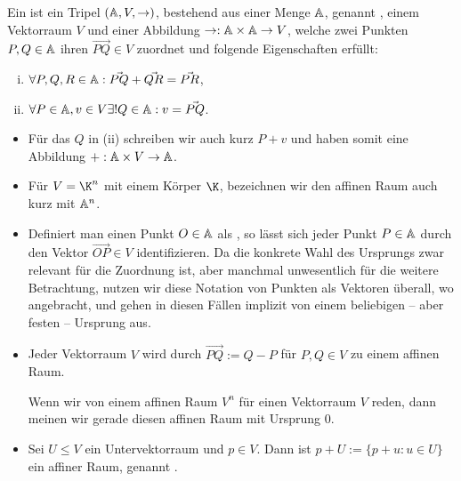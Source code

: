 \begin{df}
	Ein  ist ein Tripel $(\mathbb{A}, V, \rightarrow)$, bestehend aus einer Menge $\mathbb{A}$, genannt , einem Vektorraum $V$ und einer Abbildung $\rightarrow: \mathbb{A} \times \mathbb{A} \to V$, welche zwei Punkten $P, Q \in \mathbb{A}$ ihren  $\vec{PQ} \in V$ zuordnet und folgende Eigenschaften erfüllt:
	\begin{enumerate}[(i)]
		\item
			$\forall P, Q, R \in \mathbb{A} : \vec{PQ} + \vec{QR} = \vec{PR}$,
		\item
			$\forall P \in \mathbb{A}, v \in V \exists! Q \in \mathbb{A} : v = \vec{PQ}$.
	\end{enumerate}
	\begin{note}
		\begin{itemize}
			\item
				Für das $Q$ in (ii) schreiben wir auch kurz $P + v$ und haben somit eine Abbildung $+: \mathbb{A} \times V \to \mathbb{A}$.
			\item
				Für $V = \K^n$ mit einem Körper $\K$, bezeichnen wir den affinen Raum auch kurz mit $\mathbb{A}^n$.
			\item
				Definiert man einen Punkt $O \in \mathbb{A}$ als , so lässt sich jeder Punkt $P \in \mathbb{A}$ durch den Vektor $\vec{OP} \in V$ identifizieren.
				Da die konkrete Wahl des Ursprungs zwar relevant für die Zuordnung ist, aber manchmal unwesentlich für die weitere Betrachtung, nutzen wir diese Notation von Punkten als Vektoren überall, wo angebracht, und gehen in diesen Fällen implizit von einem beliebigen – aber festen – Ursprung aus.
		\end{itemize}
	\end{note}
\end{df}

\begin{ex}
	\begin{itemize}
		\item
			Jeder Vektorraum $V$ wird durch $\vec{PQ} := Q - P$ für $P, Q \in V$ zu einem affinen Raum.

			Wenn wir von einem affinen Raum $V^n$ für einen Vektorraum $V$ reden, dann meinen wir gerade diesen affinen Raum mit Ursprung $0$.
		\item
			Sei $U \le V$ ein Untervektorraum und $p \in V$.
			Dann ist $p + U := \{ p + u : u \in U \}$ ein affiner Raum, genannt .
	\end{itemize}
\end{ex}

